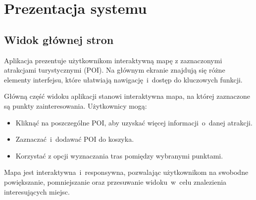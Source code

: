 
\chapter{Prezentacja systemu}
\label{ch:prezentacja-systemu}



\section{Widok głównej stron}
\label{sec:mapawidok}

Aplikacja prezentuje użytkownikom interaktywną mapę z zaznaczonymi atrakcjami turystycznymi (POI).
Na głównym ekranie znajdują się różne elementy interfejsu, które ułatwiają nawigację~i~dostęp do kluczowych funkcji.

Główną część widoku aplikacji stanowi interaktywna mapa, na której zaznaczone są punkty zainteresowania. Użytkownicy mogą:
\begin{itemize}
 \item   Kliknąć na poszczególne POI, aby uzyskać więcej informacji~o~danej atrakcji.
 \item   Zaznaczać~i~dodawać POI do koszyka.
 \item  Korzystać z opcji wyznaczania tras pomiędzy wybranymi punktami.
\end{itemize}
Mapa jest interaktywna~i~responsywna, pozwalając użytkownikom na swobodne powiększanie, pomniejszanie oraz przesuwanie widoku~w~celu znalezienia interesujących miejsc.

